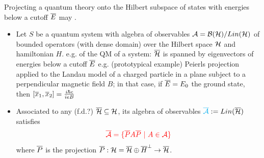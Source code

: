 {    %
            
            
    
    
    
    \cite{FioreTheCase2020} Projecting a quantum theory onto the Hilbert subspace of states with energies below a cutoff $\overline{E}$ may . 
    
        \begin{itemize}
            
        \item Let $S$ be a quantum system with algebra of observables $\mathcal A = \mathcal B(\mathcal H)/Lin(\mathcal H)$ of bounded operators (with dense domain) over the Hilbert space $\mathcal H$ and hamiltonian $H$. e.g.  of the QM of a system: $\overline{\mathcal H}$ is spanned by eigenvectors of energies below a cutoff $\overline{E}$ e.g. (prototypical example) Peierls projection applied to the Landau model of a charged particle in a plane subject to a perpendicular magnetic field $B$; in that case, if $\overline{E} = E_0$ the ground state, then $[\overline{x}_1, \overline{x}_2] = \frac{i\hbar c}{ie B}$
        
        \item Associated to any (f.d.?) $\overline{\mathcal H} \subseteq \mathcal H$, its algebra of observables $\textcolor{cyan}{\overline{\mathcal A}} := Lin(\overline{\mathcal H})$ satisfies
        \begin{equation*}
            \textcolor{red}{\overline{\mathcal A} = \{ \overline{P} A \overline{P} \ |\  A \in \mathcal A\}} 
        \end{equation*}\todo{}
        where $\overline{P}$ is the projection $\overline{P} : \mathcal H = \overline{\mathcal H} \oplus \overline{H}^\perp \to \overline{\mathcal H}$. 
        

\end{itemize}}
